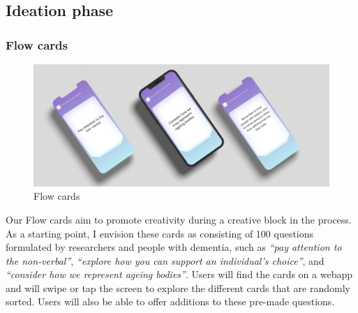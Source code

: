 \subsection{Ideation phase}
\subsubsection{Flow cards}
\begin{figure}[h]
\centering
\includegraphics[width=1\linewidth]{Images/D3Toolkit/Fig8.png}
\caption{Flow cards}
\label{fig:FlowCards}
\end{figure}
Our Flow cards aim to promote creativity during a creative block in the process. As a starting point, I envision these cards as consisting of 100 questions formulated by researchers and people with dementia, such as \textit{“pay attention to the non-verbal”}, \textit{“explore how you can support an individual’s choice”}, and \textit{“consider how we represent ageing bodies”}. Users will find the cards on a webapp and will swipe or tap the screen to explore the different cards that are randomly sorted. Users will also be able to offer additions to these pre-made questions. 

